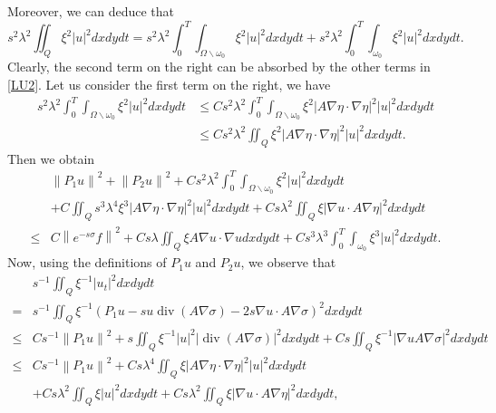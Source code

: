 \documentclass[9pt,reqno]{amsart}
\theoremstyle{plain}
\numberwithin{equation}{section}
\numberwithin{theorem}{section}
\def\Om{\Omega}
\DeclareMathOperator*{\Div}{\mathrm{div}}
\def\Om{\Omega}
\begin{document}
	Moreover, we can deduce that
	\begin{equation*}
		s^2 \lambda^2 \iint_Q \xi^{2}|u|^2dx dy d t=s^2 \lambda^2 \int_0^T \int_{\Om\backslash \omega_0} \xi^{2}|u|^2dx dy d t + s^2 \lambda^2 \int_0^T \int_{\omega_0} \xi^{2}|u|^2dx dy d t.
	\end{equation*}
	Clearly, the second term on the right can be absorbed by the other terms in \eqref{LU2}. Let us consider the first term on the right, we have
	\begin{equation*}
		\begin{split}
			s^2 \lambda^2 \int_0^T \int_{\Om\backslash \omega_0} \xi^{2}|u|^2dx dy d t
			&\le Cs^2 \lambda^2 \int_0^T \int_{\Om\backslash \omega_0} \xi^{2}\left|A \nabla \eta \cdot \nabla \eta \right|^2|u|^2dx dy d t\\
			&\le Cs^2 \lambda^2 \iint_Q \xi^{2}\left|A \nabla \eta \cdot \nabla \eta \right|^2|u|^2dx dy d t.
		\end{split}
	\end{equation*}
	Then we obtain
	\begin{equation}\label{LU3}
		\begin{split}
			&\left\|P_1 u\right\|^2+\left\|P_2 u\right\|^2+C s^2 \lambda^2 \int_0^T \int_{\Om\backslash \omega_0} \xi^{2}|u|^2dx dy d t\\
			&+  C\iint_Q s^3 \lambda^4 \xi^3\left|A \nabla \eta \cdot \nabla \eta \right|^2|u|^2 dx dydt  + C s  \lambda^2 \iint_Q\xi|\nabla u \cdot A \nabla \eta|^2 dx dy d t\\
			\leq& C\left\|e^{-s \sigma} f\right\|^2
			+Cs \lambda \iint_Q \xi A \nabla u \cdot \nabla udx dy d t+Cs^3 \lambda^3 \int_0^T \int_{\omega_0} \xi^3|u|^2dx dy d t.
		\end{split}
	\end{equation}
	Now, using the definitions of $P_1 u$ and $P_2 u$, we observe that
	\begin{equation*}
		\begin{split}
			&s^{-1} \iint_Q \xi^{-1}\left|u_t\right|^2dx dy d t\\
			=&s^{-1} \iint_Q \xi^{-1}(P_1 u -s u \Div(A\nabla \sigma)- 2s \nabla u \cdot A\nabla \sigma)^2dx dy d t\\
			\le& Cs^{-1}\left\|P_1 u\right\|^2+s   \iint_Q \xi^{-1}|u|^2|\Div(A \nabla \sigma)|^2dx dy d t +C s \iint_Q \xi^{-1}|\nabla u A \nabla \sigma|^2dx dy d t \\
			\leq& Cs^{-1}\left\|P_1 u\right\|^2+C s \lambda^4 \iint_Q \xi\left| A \nabla \eta \cdot \nabla \eta \right|^2 |u|^2dx dy d t \\
			&+C s \lambda^2  \iint_Q \xi|u|^2dx dy d t+C s \lambda^2 \iint_Q \xi|\nabla u \cdot A \nabla \eta|^2dx dy d t,
		\end{split}
	\end{equation*}
\end{document}
